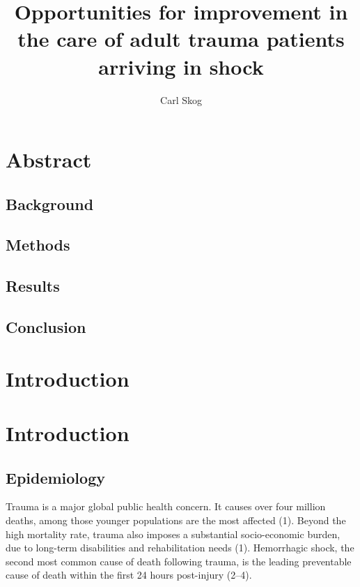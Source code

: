 \documentclass[
]{article}
\title{Opportunities for improvement in the care of adult trauma
patients arriving in shock}
\author{Carl Skog}
\date{}
\begin{document}
\maketitle

\hypertarget{abstract}{%
\section{Abstract}\label{abstract}}

\hypertarget{background}{%
\subsection{Background}\label{background}}

\hypertarget{methods}{%
\subsection{Methods}\label{methods}}

\hypertarget{results}{%
\subsection{Results}\label{results}}

\hypertarget{conclusion}{%
\subsection{Conclusion}\label{conclusion}}

\hypertarget{introduction}{%
\section{Introduction}\label{introduction}}

\hypertarget{introduction-1}{%
\section{Introduction}\label{introduction-1}}

\hypertarget{epidemiology}{%
\subsection{Epidemiology}\label{epidemiology}}

Trauma is a major global public health concern. It causes over four
million deaths, among those younger populations are the most affected
(1). Beyond the high mortality rate, trauma also imposes a substantial
socio-economic burden, due to long-term disabilities and rehabilitation
needs (1). Hemorrhagic shock, the second most common cause of death
following trauma, is the leading preventable cause of death within the
first 24 hours post-injury (2--4).
\end{document}
